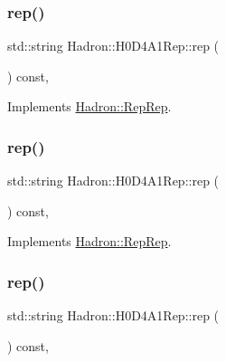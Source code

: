 \subsubsection{\texorpdfstring{rep()}{rep()}\hspace{0.1cm}{\footnotesize\ttfamily [2/5]}}
{\footnotesize\ttfamily std\+::string Hadron\+::\+H0\+D4\+A1\+Rep\+::rep (\begin{DoxyParamCaption}{ }\end{DoxyParamCaption}) const\hspace{0.3cm}{\ttfamily [inline]}, {\ttfamily [virtual]}}



Implements \mbox{\hyperlink{structHadron_1_1RepRep_ab3213025f6de249f7095892109575fde}{Hadron\+::\+Rep\+Rep}}.

\mbox{\label{structHadron_1_1H0D4A1Rep_afbedc9857e7215106a2225ff351ada68}} 
\subsubsection{\texorpdfstring{rep()}{rep()}\hspace{0.1cm}{\footnotesize\ttfamily [3/5]}}
{\footnotesize\ttfamily std\+::string Hadron\+::\+H0\+D4\+A1\+Rep\+::rep (\begin{DoxyParamCaption}{ }\end{DoxyParamCaption}) const\hspace{0.3cm}{\ttfamily [inline]}, {\ttfamily [virtual]}}



Implements \mbox{\hyperlink{structHadron_1_1RepRep_ab3213025f6de249f7095892109575fde}{Hadron\+::\+Rep\+Rep}}.

\mbox{\label{structHadron_1_1H0D4A1Rep_afbedc9857e7215106a2225ff351ada68}} 
\subsubsection{\texorpdfstring{rep()}{rep()}\hspace{0.1cm}{\footnotesize\ttfamily [4/5]}}
{\footnotesize\ttfamily std\+::string Hadron\+::\+H0\+D4\+A1\+Rep\+::rep (\begin{DoxyParamCaption}{ }\end{DoxyParamCaption}) const\hspace{0.3cm}{\ttfamily [inline]}, {\ttfamily [virtual]}}



